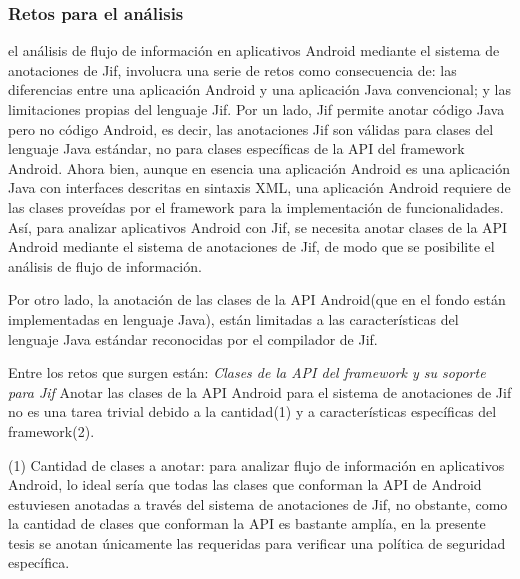 \subsubsection{Retos para el análisis}
el análisis de flujo de información en aplicativos Android mediante el sistema
de anotaciones de Jif, involucra una serie de retos como consecuencia de: las
diferencias entre una aplicación Android y una aplicación Java convencional; y
las limitaciones propias del lenguaje Jif.\newline 
Por un lado, Jif permite anotar código Java pero no código Android, es decir,
las anotaciones Jif son válidas para clases del lenguaje Java estándar, no para
clases específicas de la API del framework Android.\newline 
Ahora bien, aunque en esencia una aplicación Android es una aplicación Java con
interfaces descritas en sintaxis XML, una aplicación Android requiere de las
clases proveídas por el framework para la implementación de
funcionalidades.\newline 
Así, para analizar aplicativos Android con Jif, se
necesita anotar clases de la API Android mediante el sistema de anotaciones de
Jif, de modo que se posibilite el análisis de flujo de información.

Por otro lado, la anotación de las clases de la API Android(que en el fondo
están implementadas en lenguaje Java), están limitadas a las características del
lenguaje Java estándar reconocidas por el compilador de Jif.

Entre los retos que surgen están:\newline 
\emph{Clases de la API del framework y su soporte para Jif}\newline 
Anotar las clases de la API Android para el sistema de anotaciones de Jif no
es una tarea trivial debido a la cantidad(1) y a características específicas
del framework(2).

(1) Cantidad de clases a anotar: para analizar flujo de información en
aplicativos Android, lo ideal sería que todas las clases que conforman la API de
Android estuviesen anotadas a través del sistema de anotaciones de Jif, no
obstante, como la cantidad de clases que conforman la API es bastante amplía, en
la presente tesis se anotan únicamente las requeridas para verificar una
política de seguridad específica.
 
